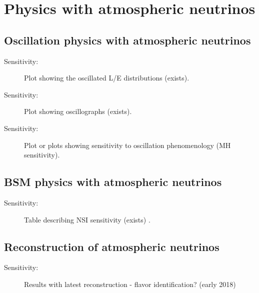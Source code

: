 \section{Physics with atmospheric neutrinos}
\label{sec:nonaccel-atm}

\subsection{Oscillation physics with atmospheric neutrinos}
\label{sec:nonaccel-atm-oscillations}


\begin{description}
\item[Sensitivity:] Plot showing the oscillated L/E distributions (exists). 
\item[Sensitivity:] Plot showing oscillographs (exists). 
\item[Sensitivity:] Plot or plots showing sensitivity to oscillation phenomenology (MH sensitivity). 
\end{description}


\subsection{BSM physics with atmospheric neutrinos}
\label{sec:nonaccel-atm-bsm}

\begin{description}
\item[Sensitivity:] Table describing NSI sensitivity (exists) . 
\end{description}

\subsection{Reconstruction of atmospheric neutrinos}
\label{sec:nonaccel-atm-reco}
\begin{description}
\item[Sensitivity:] Results with latest reconstruction - flavor identification?  (early 2018) 
\end{description}
